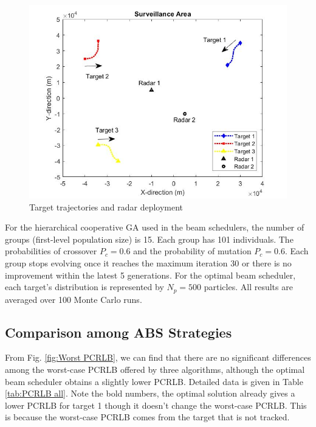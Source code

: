 \documentclass[12pt,journal,draftclsnofoot,onecolumn]{IEEEtran}
\begin{document}
\begin{figure}
	\centering
	\includegraphics[scale=0.36]{Trajectories.jpg}
	\caption{Target trajectories and radar deployment}
	\label{fig:Trajectories}
\end{figure}

For the hierarchical cooperative GA used in the beam schedulers, the number of groups (first-level population size) is 15. Each group has 101 individuals. The probabilities of crossover $P_c=0.6$ and the probability of mutation $P_c=0.6$. Each group stops evolving once it reaches the maximum iteration 30 or there is no improvement within the latest 5 generations. For the optimal beam scheduler, each target's distribution is represented by $N_p=500$ particles. All results are averaged over 100 Monte Carlo runs.

\subsection{Comparison among ABS Strategies}
From Fig. \ref{fig:Worst PCRLB}, we can find that there are no significant differences among the worst-case PCRLB offered by three algorithms, although the optimal beam scheduler obtains a slightly lower PCRLB. Detailed data is given in Table \ref{tab:PCRLB all}. Note the bold numbers, the optimal solution already gives a lower PCRLB for target 1 though it doesn't change the worst-case PCRLB. This is because the worst-case PCRLB comes from the target that is not tracked.
\end{document}
